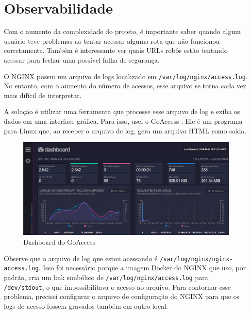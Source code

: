 \chapter{Observabilidade}

Com o aumento da complexidade do projeto, é importante saber quando algum usuário 
teve problemas ao tentar acessar alguma rota que não funcionou corretamente.
Também é interessante ver quais URLs robôs estão tentando acessar para fechar uma
possível falha de segurança.

O NGINX possui um arquivo de logs localizado em \verb|/var/log/nginx/access.log|. 
No entanto, com o aumento do número de acessos, esse arquivo se torna cada vez 
mais difícil de interpretar.

A solução é utilizar uma ferramenta que processe esse arquivo de log e exiba os 
dados em uma interface gráfica. Para isso, usei o GoAccess \cite{goaccess}. Ele 
é um programa para Linux que, ao receber o arquivo de log, gera um arquivo HTML 
como saída.




\begin{figure}[ht]
    \begin{center}
    \includegraphics[width=400pt]{img/dashboard.png}
    \caption{Dashboard do GoAccess}
    \label{fig:cloudflare-stat.png}
    \end{center}
\end{figure}

Observe que o arquivo de log que estou acessando é \verb|/var/log/nginx/nginx-access.log|. 
Isso foi necessário porque a imagem Docker do NGINX que uso, por padrão, cria um 
link simbólico de \verb|/var/log/nginx/access.log| para \verb|/dev/stdout|, o que 
impossibilitava o acesso ao arquivo. Para contornar esse problema, precisei 
configurar o arquivo de configuração do NGINX para que os logs de acesso fossem 
gravados também em outro local.

